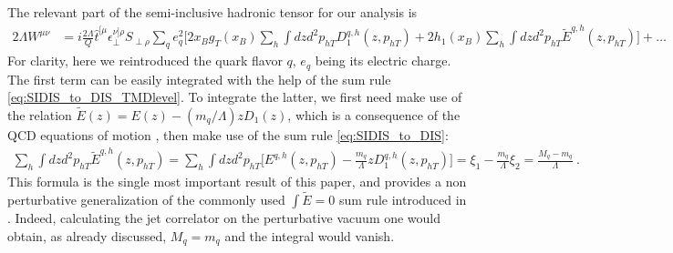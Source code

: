 \documentclass[preprintnumbers,floatfix,nofootinbib]{revtex4}
\newcommand{\xbj}{{x_B}}                   %
\newcommand{\mj}{M_q}
\newcommand{\mq}{m_q}
\begin{document}
The relevant part of the semi-inclusive hadronic tensor for our analysis is 
\begin{align}
  \label{eq:Wsidis_ini}
  2 \Lambda  W^{\mu\nu}
    & = i \frac{2\Lambda}{Q} \hat t^{[\mu}_{\phantom \perp} 
    \epsilon_\perp^{\nu]\rho}S_{\perp\rho} 
    \sum_q e_q^2
    \bigg[ 2 \xbj g_T(\xbj) \sum_h \int dz d^2p_{hT} D_1^{q,h}(z,p_{hT}) 
  + 2 h_1(\xbj) \sum_h \int dz d^2p_{hT} \tilde E^{q,h}(z,p_{hT}) \bigg] + \ldots
\end{align}
For clarity, here we reintroduced the quark flavor $q$, $e_q$ being its electric charge.
The first term can be easily integrated with the help of the sum rule
\eqref{eq:SIDIS_to_DIS_TMDlevel}. To integrate the latter, we first need make
use of the relation $\tilde E(z) = E(z) - (\mq/\Lambda) z D_1(z)$, which is a
consequence of the QCD equations of motion \cite{Bacchetta:2006tn}, then
make use of the sum rule \eqref{eq:SIDIS_to_DIS}: 
\begin{align}
  \sum_h \int dz d^2p_{hT} \tilde E^{q,h}(z,p_{hT}) 
    = \sum_h \int dz d^2p_{hT} \Big[ E^{q,h}(z,p_{hT}) - \frac{\mq}{\Lambda} z D_1^{q,h}(z,p_{hT}) \Big]
    = \xi_1 - \frac{\mq}{\Lambda} \xi_2 = \frac{\mj - \mq}{\Lambda} \ .
\end{align}
This formula is the single most important result of this paper, and provides a
non perturbative generalization of the commonly used $\int\tilde E =0$ sum
rule introduced in \cite{Jaffe:1996zw}. Indeed, calculating the jet correlator 
on the perturbative vacuum one would obtain, as already discussed, $\mj=\mq$
and the integral would vanish.
\end{document}
